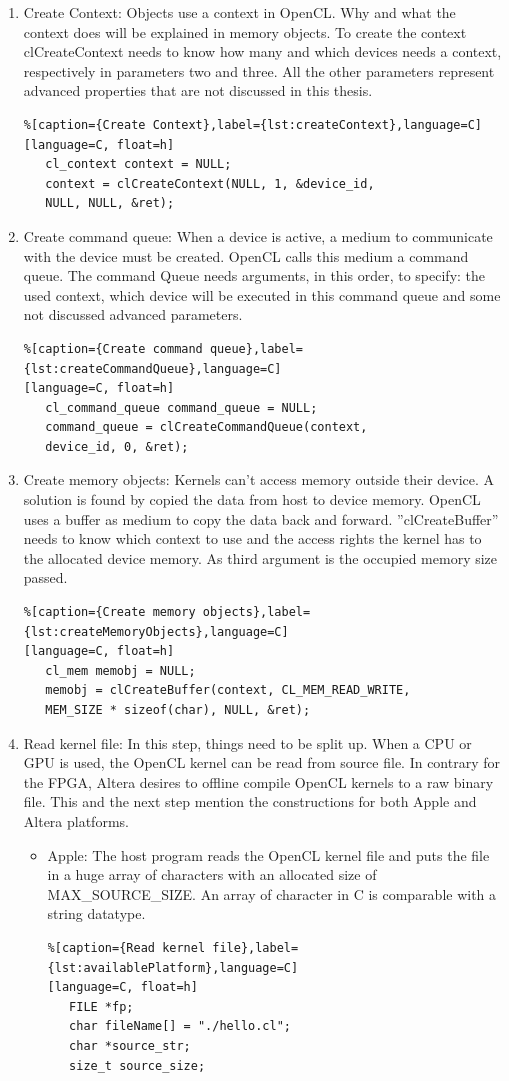 \documentclass[12pt,a4paper,english,twoside,openright]{tutthesis}
\begin{document}
\begin{enumerate}
	\item Create Context:	Objects use a context in OpenCL. Why and what the context does will be explained in memory objects. To create the context clCreateContext needs to know how many and which devices needs a context, respectively in parameters two and three. All the other parameters represent advanced properties that are not discussed in this thesis.
\begin{lstlisting}%[caption={Create Context},label={lst:createContext},language=C]
[language=C, float=h]
   cl_context context = NULL;
   context = clCreateContext(NULL, 1, &device_id,
   NULL, NULL, &ret);
\end{lstlisting}

	\item Create command queue:	When a device is active, a medium to communicate with the device must be created. OpenCL calls this medium a command queue. The command Queue needs arguments, in this order, to specify: the used context, which device will be executed in this command queue and some not discussed advanced parameters.
\begin{lstlisting}%[caption={Create command queue},label={lst:createCommandQueue},language=C]
[language=C, float=h]
   cl_command_queue command_queue = NULL;
   command_queue = clCreateCommandQueue(context,
   device_id, 0, &ret);
\end{lstlisting}

	\item Create memory objects:	Kernels can't access memory outside their device. A solution is found by copied the data from host to device memory. OpenCL uses a buffer as medium to copy the data back and forward. ''clCreateBuffer'' needs to know which context to use and the access rights the kernel has to the allocated device memory. As third argument is the occupied memory size passed.
\begin{lstlisting}%[caption={Create memory objects},label={lst:createMemoryObjects},language=C]
[language=C, float=h]
   cl_mem memobj = NULL;
   memobj = clCreateBuffer(context, CL_MEM_READ_WRITE,
   MEM_SIZE * sizeof(char), NULL, &ret);
\end{lstlisting}

	\item Read kernel file:	In this step, things need to be split up. When a CPU or GPU is used, the OpenCL kernel can be read from source file. In contrary for the FPGA, Altera desires to offline compile OpenCL kernels to a raw binary file. This and the next step mention the constructions for both Apple and Altera platforms.
		\begin{itemize}
			\item Apple: The host program reads the OpenCL kernel file and puts the file in a huge array of characters with an allocated size of MAX\_SOURCE\_SIZE. An array of character in C is comparable with a string datatype.
\begin{lstlisting}%[caption={Read kernel file},label={lst:availablePlatform},language=C]
[language=C, float=h]
   FILE *fp;
   char fileName[] = "./hello.cl";
   char *source_str;
   size_t source_size;
 

\end{lstlisting}
\end{itemize}
\end{enumerate}
\end{document}
